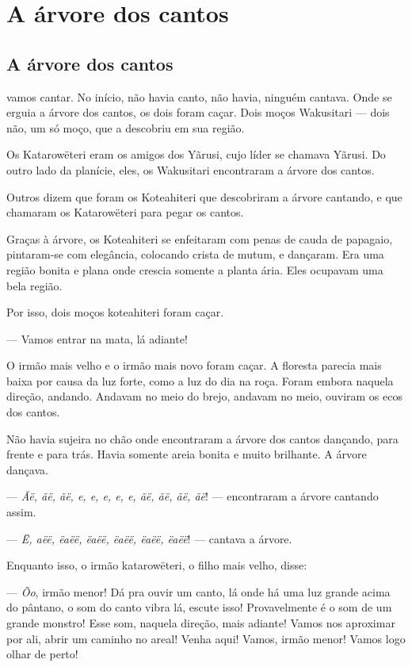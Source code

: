\part{A árvore dos cantos}

\chapter{A árvore dos cantos}

 vamos cantar. No início, não havia canto, não havia, ninguém
cantava. Onde se erguia a árvore dos cantos, os dois foram caçar. Dois
moços Wakusitari --- dois não, um só moço, que a descobriu em sua região.

Os Katarowëteri eram os amigos dos Yãrusi, cujo líder se chamava Yãrusi.
Do outro lado da planície, eles, os Wakusitari encontraram a árvore dos
cantos. 

Outros dizem que foram os Koteahiteri que descobriram a árvore cantando,
e que chamaram os Katarowëteri para pegar os cantos. 

Graças à árvore, os Koteahiteri se enfeitaram com penas de cauda de
papagaio, pintaram-se com elegância, colocando crista de mutum, e
dançaram. Era uma região bonita e plana onde crescia somente a planta
ária. Eles ocupavam uma bela região. 

Por isso, dois moços koteahiteri foram caçar. 

--- Vamos entrar na mata, lá adiante! 

O irmão mais velho e o irmão mais novo foram caçar. A floresta parecia
mais baixa por causa da luz forte, como a luz do dia na roça. Foram
embora naquela direção, andando. Andavam no meio do brejo, andavam no
meio, ouviram os ecos dos cantos. 

Não havia sujeira no chão onde encontraram a árvore dos cantos dançando,
para frente e para trás. Havia somente areia bonita e muito brilhante. A
árvore dançava. 

--- \textit{Ãë, ãë, ãë, e, e, e, e, e, ãë, ãë, ãë, ãë}! --- encontraram a árvore
cantando assim. 

--- \textit{Ë, aëë, ëaëë, ëaëë, ëaëë, ëaëë, ëaëë}! --- cantava a árvore. 

Enquanto isso, o irmão katarowëteri, o filho mais velho, disse: 

--- \textit{Õo}, irmão menor! Dá pra ouvir um canto, lá onde há uma luz grande
acima do pântano, o som do canto vibra lá, escute isso! Provavelmente é
o som de um grande monstro! Esse som, naquela direção, mais adiante!
Vamos nos aproximar por ali, abrir um caminho no areal! Venha aqui!
Vamos, irmão menor! Vamos logo olhar de perto! 

